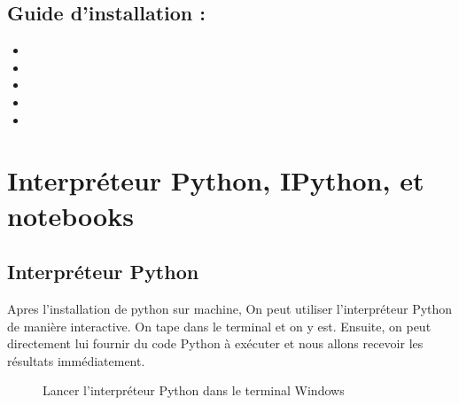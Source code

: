 \documentclass[letterpaper,10pt,french]{sphinxmanual}
\let\sphinxpxdimen\pdfpxdimen\else\newdimen\sphinxpxdimen
\begin{document}
\subsection{Guide d’installation :}
\label{\detokenize{ch00:guide-dinstallation}}\begin{itemize}
\item {} 
\sphinxAtStartPar
{}

\item {} 
\sphinxAtStartPar
{}

\item {} 
\sphinxAtStartPar
{}

\item {} 
\sphinxAtStartPar
{}

\item {} 
\sphinxAtStartPar
{}

\end{itemize}


\section{Interpréteur Python, IPython, et notebooks}
\label{\detokenize{ch01:interpreteur-python-ipython-et-notebooks}}\label{\detokenize{ch01::doc}}

\subsection{Interpréteur Python}
\label{\detokenize{ch01:interpreteur-python}}
\sphinxAtStartPar
Apres l’installation de python sur machine, On peut utiliser l’interpréteur Python de manière interactive. On tape  dans le terminal et on y est. Ensuite, on peut directement lui fournir du code Python à exécuter et nous allons recevoir les résultats immédiatement.

\begin{figure}[htbp]
\centering
\capstart

\noindent\sphinxincludegraphics[width=400\sphinxpxdimen]{{interpwindows}.PNG}
\caption{Lancer l’interpréteur Python dans le terminal Windows}\label{\detokenize{ch01:markdown-fig}}\end{figure}
\end{document}
